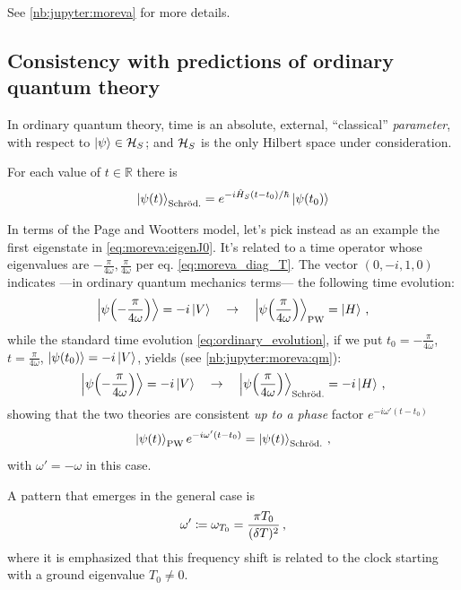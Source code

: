 See \ref{nb:jupyter:moreva} for more details.


\subsection{Consistency with predictions of ordinary quantum theory}
\label{sec:qubit:pw-vs-qm}

In ordinary quantum theory, time is an absolute, external, ``classical'' \emph{parameter},
with respect to $\ket{\psi} \in \mathcal{H}_S$; and $\mathcal{H}_S$
is the only Hilbert space under consideration.

For each value of $t \in \mathbb{R}$ there is
\begin{equation}\label{eq:ordinary_evolution}
  \ket{\psi(t)}_{\text{Schr\"od.}} =
  e^{-i\hat{H}_{S}(t-t_0)/\hbar}\ket{\psi(t_0)}
\end{equation}

In terms of the Page and Wootters model,
let's pick instead as an example the first eigenstate in \eqref{eq:moreva:eigenJ0}.
It's related to a time operator whose eigenvalues are
$-\frac{\pi}{4\omega}, \frac{\pi}{4\omega}$
per eq. \eqref{eq:moreva_diag_T}.
The vector $(0, -i, 1, 0)$ indicates ---in ordinary quantum mechanics terms---
the following time evolution:
\begin{equation}
  \ket{\psi\qty(-\frac{\pi}{4\omega})} = -i\ket{V}
  \quad \rightarrow \quad
  \ket{\psi\qty( \frac{\pi}{4\omega})}_{\mathrm{PW}} =   \ket{H}
  \, \text{,}
\end{equation}
while the standard time evolution \eqref{eq:ordinary_evolution}, if we put
$t_0 = -\frac{\pi}{4\omega}$, $t = \frac{\pi}{4\omega}$, $\ket{\psi\qty(t_0)} = -i\ket{V}$,
yields (see \ref{nb:jupyter:moreva:qm}):
\begin{equation}
  \ket{\psi\qty(-\frac{\pi}{4\omega})} = -i\ket{V}
  \quad \rightarrow \quad
  \ket{\psi\qty( \frac{\pi}{4\omega})}_{\mathrm{Schr\ddot{o}d.}} = -i\ket{H}
  \, \text{,}
\end{equation}
showing that the two theories are consistent \emph{up to a phase} factor
$e^{-i\omega'(t - t_{0})}$
\begin{equation}
  \ket{\psi(t)}_{\mathrm{PW}} e^{-i\omega'(t - t_{0})} = \ket{\psi(t)}_{\mathrm{Schr\ddot{o}d.}} \,\text{,}  
\end{equation}
with $\omega' = -\omega$ in this case.

A pattern that emerges in the general case is
\[
  \omega' \coloneqq \omega_{T_{0}} = \frac{\pi T_0}{(\delta T)^2} \,\text{,}
\]
where it is emphasized that this frequency shift is related to the clock starting
with a ground eigenvalue $T_0 \ne 0$.

